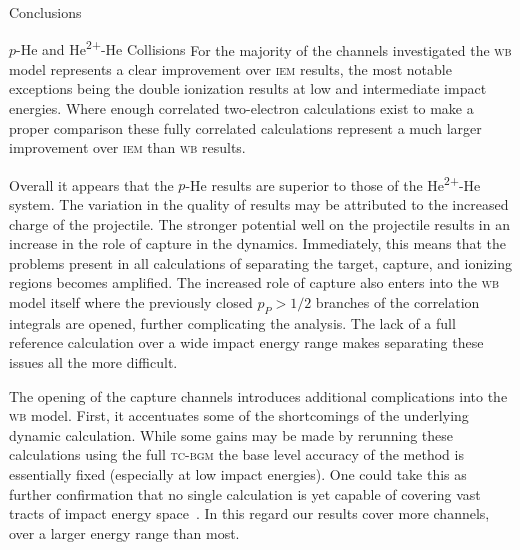 \documentclass[letterpaper, 11 pt]{report}
\begin{document}
\begin{chapter}{Conclusions \label{chap:con}}
\begin{section}{\texorpdfstring{$p$}{p}-He and \texorpdfstring{He\textsuperscript{2+}}{He2+}-He
                   Collisions \label{sec:con-phe2p-he}}
      For the majority of the channels investigated the \textsc{wb} model represents a clear improvement
      over \textsc{iem}  results, the most notable exceptions being the double ionization results at low
      and intermediate impact energies. Where enough correlated two-electron calculations exist to make
      a proper comparison these fully correlated calculations represent a much larger improvement over
      \textsc{iem} than \textsc{wb} results.

      Overall it appears that the $p$-He results are superior to those of the He\textsuperscript{2+}-He
      system. The variation in the quality of results may be attributed to the increased charge of the
      projectile. The stronger potential well on the projectile results in an increase in the role of
      capture in the dynamics. Immediately, this means that the problems present in all calculations of
      separating the target, capture, and ionizing regions becomes amplified. The increased role of
      capture also enters into the \textsc{wb} model itself where the previously closed $p_P > 1/2$
      branches of the correlation integrals are opened, further complicating the analysis. The lack of a
      full reference calculation over a wide impact energy range makes separating these issues all the
      more difficult.

      The opening of the capture channels introduces additional complications into the \textsc{wb}
      model. First, it accentuates some of the shortcomings of the underlying dynamic calculation.
      While some gains may be made by rerunning these calculations using the full \textsc{tc-bgm} the
      base level accuracy of the method is essentially fixed (especially at low impact energies). One
      could take this as further confirmation that no single calculation is yet capable of covering vast
      tracts of impact energy space~\cite{LRV-14}. In this regard our results cover more channels, over
      a larger energy range than most.


\end{section}
\end{chapter}
\end{document}
